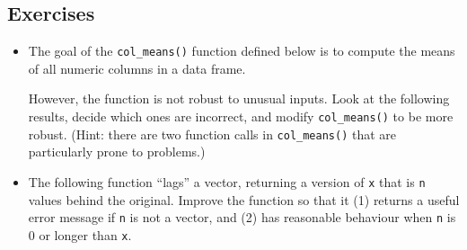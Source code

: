 \hypertarget{exercises-1}{%
\subsection{Exercises}\label{exercises-1}}

\begin{itemize}
\item
  The goal of the \texttt{col\_means()} function defined below is to
  compute the means of all numeric columns in a data frame.

\begin{Shaded}
\begin{Highlighting}[]
\StringTok{ }
\StringTok{ }
\StringTok{ }

  \NormalTok{(}
\NormalTok{\}}
\end{Highlighting}
\end{Shaded}

  However, the function is not robust to unusual inputs. Look at the
  following results, decide which ones are incorrect, and modify
  \texttt{col\_means()} to be more robust. (Hint: there are two function
  calls in \texttt{col\_means()} that are particularly prone to
  problems.)

\begin{Shaded}
\begin{Highlighting}[]
\NormalTok{(mtcars[, }\NormalTok{])}
\NormalTok{(mtcars[}\NormalTok{, ])}
\NormalTok{(mtcars[, }\NormalTok{, }\NormalTok{ F])}
\NormalTok{(}\OperatorTok{:}\NormalTok{)}
\NormalTok{(}
\NormalTok{(}

\StringTok{ }
\NormalTok{mtcars2[}\OperatorTok{-}\NormalTok{] <-}\StringTok{ }\NormalTok{(mtcars2[}\OperatorTok{-}\NormalTok{], as.character)}
\end{Highlighting}
\end{Shaded}
\item
  The following function ``lags'' a vector, returning a version of
  \texttt{x} that is \texttt{n} values behind the original. Improve the
  function so that it (1) returns a useful error message if \texttt{n}
  is not a vector, and (2) has reasonable behaviour when \texttt{n} is 0
  or longer than \texttt{x}.


\end{itemize}
